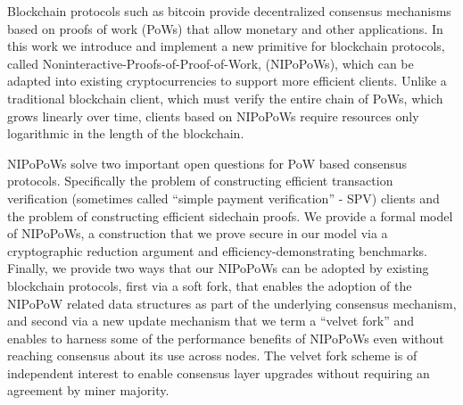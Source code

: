 Blockchain protocols such as bitcoin provide decentralized consensus
mechanisms based on proofs of work (PoWs) 
that allow monetary and other applications. 
%
In this work we introduce and implement a new primitive for blockchain protocols, called Noninteractive-Proofs-of-Proof-of-Work, (NIPoPoWs), which can be adapted into existing cryptocurrencies to support more efficient clients.
Unlike a traditional blockchain client, which must verify the entire chain of PoWs, which grows linearly over time, clients based on NIPoPoWs require resources only logarithmic in the length of the blockchain.

NIPoPoWs solve two important open questions for PoW based consensus
protocols. Specifically the problem  
of constructing efficient transaction verification (sometimes called
``simple payment verification'' - SPV) clients and 
the problem of constructing efficient sidechain proofs. 
%
%
We provide a formal model of NIPoPoWs, a construction that we prove
secure in our model 
via a cryptographic reduction argument and 
efficiency-demonstrating benchmarks.
Finally, we provide two ways that our NIPoPoWs can be adopted by
 existing blockchain protocols, first via a soft fork, that enables the 
   adoption of the NIPoPoW related data structures
  as part of the underlying consensus mechanism, 
 and second  via a new update mechanism 
that we term a ``velvet fork'' and enables to harness some of
the performance benefits of NIPoPoWs even without reaching consensus about its use
across nodes. The velvet fork scheme is of independent interest to enable
consensus layer upgrades without requiring an agreement by miner majority.


